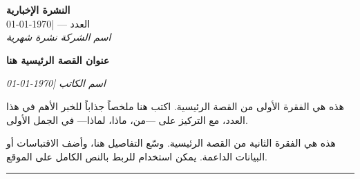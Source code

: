 \documentclass[11pt,a4paper]{article}
\begin{document}
\thispagestyle{fancy}

\noindent\colorbox{accentdark}{\parbox{\dimexpr\textwidth-2\fboxsep\relax}{%
\centering
\vspace{0.3em}
{\color{white}\Huge\bfseries النشرة الإخبارية}\\[0.2em]
{\color{white}\large العدد --- \quad|\quad \today}\\[0.2em]
{\color{white}\small\itshape اسم الشركة \textemdash{} نشرة شهرية}
\vspace{0.2em}
}}

\vspace{0.6em}

{\LARGE\bfseries\color{accentdark} عنوان القصة الرئيسية هنا}

\vspace{0.3em}
{\small\itshape {} اسم الكاتب \quad|\quad \today}

\vspace{0.4em}
\begin{center}
\end{center}

\vspace{0.4em}
هذه هي الفقرة الأولى من القصة الرئيسية. اكتب هنا ملخصاً%
جذاباً للخبر الأهم في هذا العدد، مع التركيز على%
---من، ماذا، لماذا--- في الجمل الأولى.

هذه هي الفقرة الثانية من القصة الرئيسية. وسّع التفاصيل هنا،%
وأضف الاقتباسات أو البيانات الداعمة. يمكن استخدام%
 للربط بالنص الكامل على الموقع.

\vspace{0.3em}\hrule\vspace{0.6em}
\end{document}
